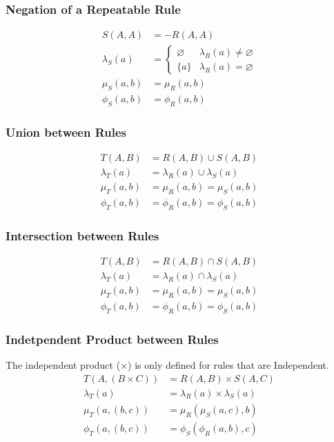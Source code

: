 \documentclass{article}
\begin{document}
\subsubsection{Negation of a Repeatable Rule}

\begin{align*}
          S (A, A) & = - R (A, A) \\
  \lambda_S (a)    & = \begin{cases} \varnothing & \lambda_R (a) \neq \varnothing \\ \{ a \} & \lambda_R (a) = \varnothing \end{cases} \\
      \mu_S (a, b)    & =  \mu_R (a, b) \\
     \phi_S (a, b)    & = \phi_R (a, b) 
\end{align*}

\subsubsection{Union between Rules}

\begin{align*}
          T (A, B) & = R (A, B) \cup S (A, B) \\
  \lambda_T (a)    & = \lambda_R (a) \cup \lambda_S (a) \\
      \mu_T (a, b) & = \mu_R  (a, b)    = \mu_S  (a, b) \\
     \phi_T (a, b) & = \phi_R (a, b)    = \phi_S (a, b)
\end{align*}

\subsubsection{Intersection between Rules}

\begin{align*}
          T (A, B) & = R (A, B) \cap S (A, B) \\
  \lambda_T (a)    & = \lambda_R (a) \cap \lambda_S (a) \\
      \mu_T (a, b) & =  \mu_R (a, b) =  \mu_S (a, b) \\
     \phi_T (a, b) & = \phi_R (a, b) = \phi_S (a, b)
\end{align*}

\subsubsection{Indetpendent Product between Rules}
The independent product ($ \times $) is only defined for rules that are Independent.
\begin{align*}
          T (A, (B \times C)) & = R (A, B) \times S (A, C) \\
  \lambda_T (a)               & = \lambda_R (a) \times \lambda_S (a) \\
      \mu_T (a, (b, c))       & =  \mu_R  ( \mu_S (a, c), b) \\
     \phi_T (a, (b, c))       & = \phi_S  (\phi_R (a, b), c) 
\end{align*}
\end{document}
